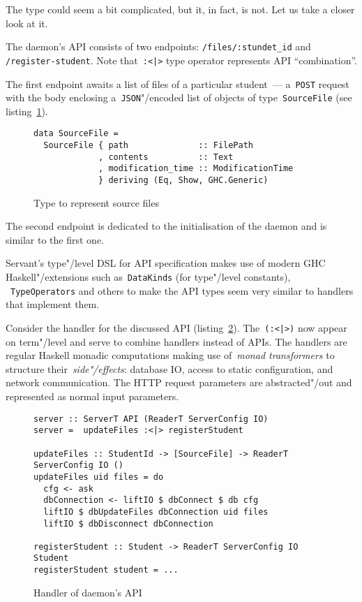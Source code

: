 The type could seem a bit complicated, but it, in fact, is not.
Let us take a closer look at it.

The daemon's API consists of two endpoints: \lstinline{/files/:stundet_id}
and \lstinline{/register-student}. Note that~\lstinline{:<|>} type operator
represents API ``combination''.

The first endpoint awaits a list of files of a
particular student~--- a~\lstinline{POST} request with the body
enclosing a~\lstinline{JSON}"/encoded list of objects of type~\lstinline{SourceFile}
(see listing~\ref{listing:sourcefile}).

\begin{figure}[h]
\begin{lstlisting}
data SourceFile =
  SourceFile { path              :: FilePath
             , contents          :: Text
             , modification_time :: ModificationTime
             } deriving (Eq, Show, GHC.Generic)
\end{lstlisting}
\caption{Type to represent source files}
\label{listing:sourcefile}
\end{figure}

The second endpoint is dedicated to the initialisation of the daemon and is similar
to the first one.

Servant's type"/level DSL for API specification makes use of modern GHC
Haskell"/extensions such as~\lstinline{DataKinds} (for type"/level constants),
~\lstinline{TypeOperators} and others to make the API types seem very similar to handlers
that implement them.

Consider the handler for the discussed API (listing~\ref{listing:sbbDaemonHandler}).
The~\lstinline{(:<|>)} now appear on term"/level and serve to combine handlers instead of
APIs. The handlers are regular Haskell monadic computations making
use of~\emph{monad transformers} to structure their~\emph{side"/effects}:
database IO, access to static configuration, and network communication. The HTTP
request parameters are abstracted"/out and represented as normal input parameters.

\begin{figure}[h]
\begin{lstlisting}
server :: ServerT API (ReaderT ServerConfig IO)
server =  updateFiles :<|> registerStudent

updateFiles :: StudentId -> [SourceFile] -> ReaderT ServerConfig IO ()
updateFiles uid files = do
  cfg <- ask
  dbConnection <- liftIO $ dbConnect $ db cfg
  liftIO $ dbUpdateFiles dbConnection uid files
  liftIO $ dbDisconnect dbConnection

registerStudent :: Student -> ReaderT ServerConfig IO Student
registerStudent student = ...
\end{lstlisting}
\caption{Handler of daemon's API}
\label{listing:sbbDaemonHandler}
\end{figure}

